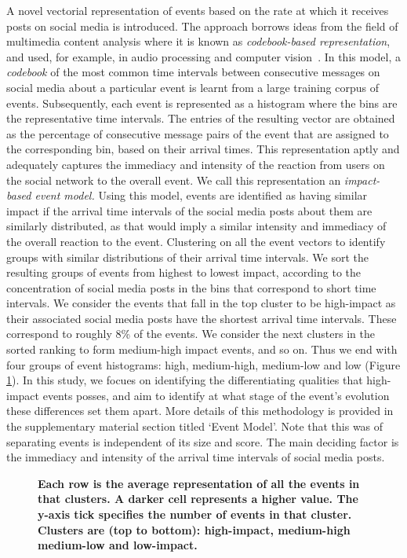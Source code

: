 \documentclass[10pt,letterpaper]{article}
\begin{document}
A novel vectorial representation of events based on the rate at which it receives
posts on social media is introduced.
The
approach borrows ideas from the field of multimedia content analysis where
it is known as {\em codebook-based representation}, and used, for
example, in audio processing and computer vision~\cite{ff,Vaizman}.
In this model, a \emph{codebook} of the most common time intervals between
consecutive messages on social media about a particular event is
learnt from a large training corpus of events.  Subsequently, 
each event is represented as a histogram where the bins are the
representative time intervals.
The entries of the resulting vector are obtained as the percentage of
consecutive message pairs of the event that are assigned to the
corresponding bin, based on their arrival times.
This representation aptly and adequately captures the immediacy and
intensity of the reaction from users on the social network to the overall event. We call this
representation an \emph{impact-based event model.} Using this model,
events are identified as having similar impact if the arrival time
intervals of the social media posts about them are similarly distributed, as that would imply a similar
intensity and immediacy of the overall reaction to the event.
Clustering on all the event vectors to identify groups with
similar distributions of their arrival time intervals.  We sort the
resulting groups of events from highest to lowest impact, according to
the concentration of social media posts in the bins that correspond to
short time intervals. We consider the events that fall in the top cluster
to be high-impact as their associated social media posts have
the shortest arrival time intervals. 
These correspond to roughly 8\% of the events.
We consider the next clusters
in the sorted ranking to form medium-high impact events, and so on.  Thus
we end with four groups of event histograms: high, medium-high, medium-low and low (Figure
\ref{fig:low_buzz_high_buzz}).  In this study, we focues on identifying the differentiating
qualities that high-impact events posses, and aim to identify at what stage of the event's evolution
these differences set them apart.  More details of this methodology is provided in the supplementary
material section titled `Event Model'.  Note that this was of separating events is independent of
its size and score.  The main deciding factor is the immediacy and intensity of the arrival
time intervals of social media posts. 

\begin{figure}
  \caption{\textbf{Each row is the average representation of all the events in
      that clusters.  A darker cell represents a higher value.  The y-axis tick specifies 
        the number of events in that cluster.  Clusters are (top to bottom):  high-impact, medium-high
        medium-low and low-impact.}
  }
  \label{fig:low_buzz_high_buzz}
\end{figure}
\end{document}
